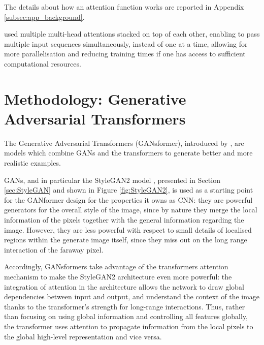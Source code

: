 \documentclass{article}
\begin{document}
	The details about how an attention function works are reported in Appendix 
	\ref{subsec:app_background}. 
	
	\citet{vaswani2017attention}used multiple multi-head attentions stacked on top of each other, 
	enabling to pass multiple input sequences simultaneously, instead of one at a time, allowing for 
	more parallelisation and reducing training times if one has access to sufficient computational 
	resources.
	
	\section{Methodology: Generative Adversarial Transformers}\label{sec:ganformer}
	
	The Generative Adversarial Transformers (GANsformer), introduced by 
	\citet{hudson2021generative}, are models which combine GANs and the transformers to 
	generate 
	better and more realistic examples.
	
	GANs, and in particular the StyleGAN2 model \cite{karras2020analyzing}, presented in Section 
	\ref{sec:StyleGAN} and shown in Figure \ref{fig:StyleGAN2}, is used as a starting point for the 
	GANformer design for the properties it owns as CNN: they are powerful generators for the overall 
	style of the image, since by nature they merge the local information of the pixels together with the 
	general information regarding the image. 
	However, they are less powerful with respect to small details of localised regions within the 
	generate 
	image itself, since they miss out on the long range interaction of the faraway pixel.
	
	Accordingly, GANsformers take advantage of the transformers attention mechanism to make the 
	StyleGAN2 architecture even more powerful: the integration of attention in the architecture allows 
	the network to draw global dependencies between input and output, and understand the context of 
	the image thanks to the transformer's strength for long-range interactions.
	Thus, rather than focusing on using global information and controlling all features globally, 
	the transformer uses attention to propagate information from the local pixels to the global high-level 
	representation and vice versa. 
	
\end{document}
